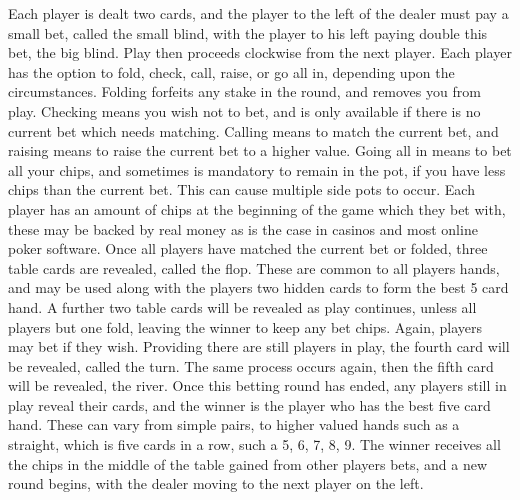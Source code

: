 Each player is dealt two cards, and the player to the left of the dealer must
pay a small bet, called the small blind, with the player to his left paying 
double this bet, the big blind. Play then proceeds clockwise from the next
player. Each player has the option to fold, check, call, raise, or go all in,
depending upon the circumstances. Folding forfeits any stake in the round, and
removes you from play. Checking means you wish not to bet, and is only
available if there is no current bet which needs matching. Calling means to
match the current bet, and raising means to raise the current bet to a higher
value. Going all in means to bet all your chips, and sometimes is mandatory to
remain in the pot, if you have less chips than the current bet. This can cause
multiple side pots to occur. Each player has an amount of chips at the 
beginning of the game which they bet with, these may be backed by real money as
is the case in casinos and most online poker software. Once all players have
matched the current bet or folded, three table cards are revealed, called
the flop. These are common to all players hands, and may be used along with
the players two hidden cards to form the best 5 card hand. A further two table
cards will be revealed as play continues, unless all players but one fold,
leaving the winner to keep any bet chips. Again, players may bet if they wish.
Providing there are still players in play, the fourth card will be revealed, 
called the turn. The same process occurs again, then the fifth card will be
revealed, the river. Once this betting round has ended, any players still
in play reveal their cards, and the winner is the player who has the best
five card hand. These can vary from simple pairs, to higher valued hands such
as a straight, which is five cards in a row, such a 5, 6, 7, 8, 9. The winner
receives all the chips in the middle of the table gained from other players
bets, and a new round begins, with the dealer moving to the next player on the
left.
